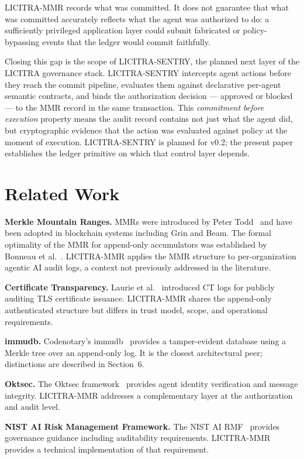 \documentclass[sigconf,natbib=false]{acmart}
\begin{document}
LICITRA-MMR records what was committed. It does not guarantee that what was
committed accurately reflects what the agent was authorized to do: a
sufficiently privileged application layer could submit fabricated or
policy-bypassing events that the ledger would commit faithfully.

Closing this gap is the scope of LICITRA-SENTRY, the planned next layer of
the LICITRA governance stack. LICITRA-SENTRY intercepts agent actions
before they reach the commit pipeline, evaluates them against declarative
per-agent semantic contracts, and binds the authorization decision ---
approved or blocked --- to the MMR record in the same transaction. This
\emph{commitment before execution} property means the audit record contains
not just what the agent did, but cryptographic evidence that the action was
evaluated against policy at the moment of execution. LICITRA-SENTRY is
planned for v0.2; the present paper establishes the ledger primitive on
which that control layer depends.

\section{Related Work}

\textbf{Merkle Mountain Ranges.} MMRs were introduced by Peter
Todd~\cite{todd2013} and have been adopted in blockchain systems including
Grin and Beam. The formal optimality of the MMR for append-only
accumulators was established by Bonneau et al.~\cite{bonneau2025}.
LICITRA-MMR applies the MMR structure to per-organization agentic AI audit
logs, a context not previously addressed in the literature.

\textbf{Certificate Transparency.} Laurie et al.~\cite{laurie2013}
introduced CT logs for publicly auditing TLS certificate issuance.
LICITRA-MMR shares the append-only authenticated structure but differs in
trust model, scope, and operational requirements.

\textbf{immudb.} Codenotary's immudb~\cite{immudb} provides a
tamper-evident database using a Merkle tree over an append-only log. It is
the closest architectural peer; distinctions are described in Section~6.

\textbf{Oktsec.} The Oktsec framework~\cite{oktsec} provides agent identity
verification and message integrity. LICITRA-MMR addresses a complementary
layer at the authorization and audit level.

\textbf{NIST AI Risk Management Framework.} The NIST AI RMF~\cite{nistai}
provides governance guidance including auditability requirements.
LICITRA-MMR provides a technical implementation of that requirement.
\end{document}
